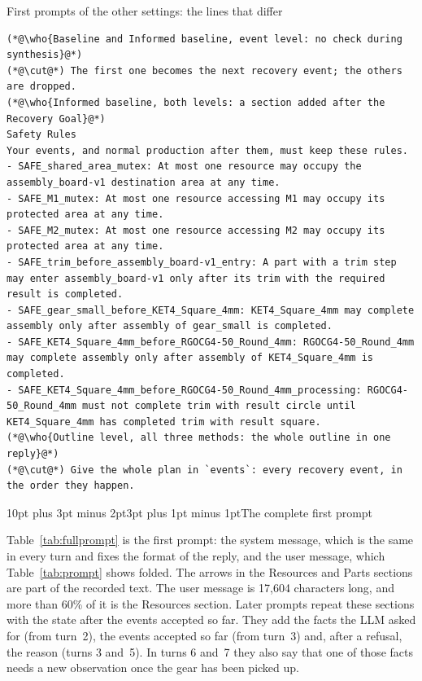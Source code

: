 \documentclass[preprint,12pt,authoryear]{elsarticle}
\makeatletter
\renewcommand\subsection{\@startsection{subsection}{2}{\z@}%
  {10pt plus 3pt minus 2pt}{3pt plus 1pt minus 1pt}{\normalsize\bfseries}}
\newcommand{\who}[1]{{\normalfont\bfseries\fontsize{9}{11}\selectfont\rule{0pt}{2.6ex}#1}}
\makeatother
\begin{document}
\begin{table}[!htb]
\begin{recbox}{First prompts of the other settings: the lines that differ}
\begin{lstlisting}
(*@\who{Baseline and Informed baseline, event level: no check during synthesis}@*)
(*@\cut@*) The first one becomes the next recovery event; the others are dropped.
(*@\who{Informed baseline, both levels: a section added after the Recovery Goal}@*)
Safety Rules
Your events, and normal production after them, must keep these rules.
- SAFE_shared_area_mutex: At most one resource may occupy the assembly_board-v1 destination area at any time.
- SAFE_M1_mutex: At most one resource accessing M1 may occupy its protected area at any time.
- SAFE_M2_mutex: At most one resource accessing M2 may occupy its protected area at any time.
- SAFE_trim_before_assembly_board-v1_entry: A part with a trim step may enter assembly_board-v1 only after its trim with the required result is completed.
- SAFE_gear_small_before_KET4_Square_4mm: KET4_Square_4mm may complete assembly only after assembly of gear_small is completed.
- SAFE_KET4_Square_4mm_before_RGOCG4-50_Round_4mm: RGOCG4-50_Round_4mm may complete assembly only after assembly of KET4_Square_4mm is completed.
- SAFE_KET4_Square_4mm_before_RGOCG4-50_Round_4mm_processing: RGOCG4-50_Round_4mm must not complete trim with result circle until KET4_Square_4mm has completed trim with result square.
(*@\who{Outline level, all three methods: the whole outline in one reply}@*)
(*@\cut@*) Give the whole plan in `events`: every recovery event, in the order they happen.
\end{lstlisting}
\end{recbox}
\caption{What the first prompt of each other setting changes. The Informed baseline is given the seven safety rules; the framework is not.}\label{tab:settings}
\end{table}

\subsection{The complete first prompt}

Table~\ref{tab:fullprompt} is the first prompt: the system message, which is the same in
every turn and fixes the format of the reply, and the user message, which
Table~\ref{tab:prompt} shows folded. The arrows in the Resources and Parts sections are part
of the recorded text. The user message is 17,604 characters long, and
more than 60\% of it is the Resources section. Later prompts repeat these sections with the
state after the events accepted so far. They add the facts the LLM asked for (from turn~2),
the events accepted so far (from turn~3) and, after a refusal, the reason (turns 3 and~5). In
turns 6 and~7 they also say that one of those facts needs a new observation once the gear has
been picked up.
\end{document}
